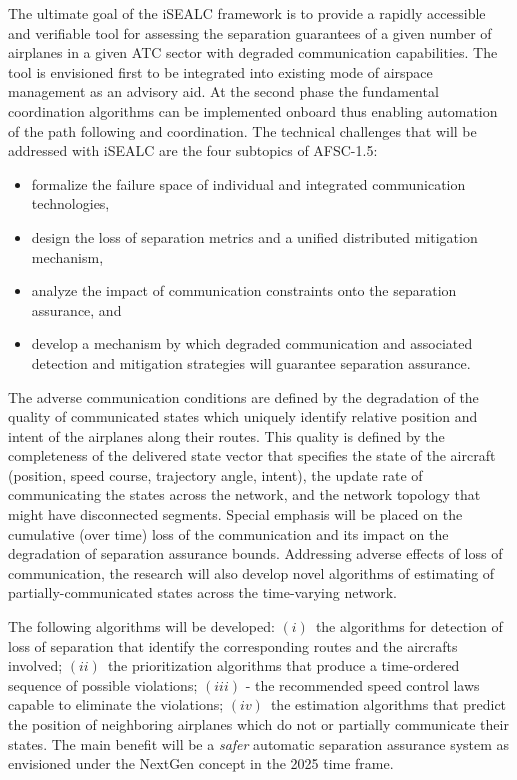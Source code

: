 \documentclass[letter,onecolumn,12pt]{aiaa-tc}
\newcommand{\1}{1_n}
\begin{document}
The ultimate goal of the iSEALC framework is to provide a rapidly accessible and verifiable tool for assessing the separation guarantees of a given number of airplanes in a given ATC sector with degraded communication capabilities.  The tool is  envisioned first to be integrated into existing mode of airspace management as an advisory aid. At the second phase the fundamental coordination algorithms can be implemented onboard thus enabling automation of the path following and coordination. The technical challenges that will be addressed with iSEALC are the four subtopics of AFSC-1.5:
\vspace{-2mm}
\begin{itemize}
\setlength{\itemsep}{-4pt}
    \item formalize the failure space of individual and integrated communication technologies,
    \item design the loss of separation metrics and a unified distributed mitigation mechanism,
    \item analyze the impact of  communication constraints onto the separation assurance, and
    \item develop a mechanism by which degraded communication and associated detection and mitigation strategies will guarantee separation assurance.
\end{itemize}
\vspace{-2mm}

The adverse communication conditions are defined by the degradation of the quality of communicated states which uniquely identify relative position and intent of the airplanes along their routes. This quality is defined by the completeness of the delivered state vector that specifies the state of the aircraft (position, speed course, trajectory angle, intent), the update rate of communicating the states across the network, and the network topology that might have disconnected segments. Special emphasis will be placed on the cumulative (over time) loss of the communication and its impact on the degradation of separation assurance bounds. Addressing adverse effects of loss of communication, the research will also develop novel algorithms of estimating of partially-communicated states across the time-varying network.

The following algorithms will be developed: $(i)$~the algorithms for detection of loss of separation that identify the corresponding routes and the aircrafts involved; $(ii)$~the prioritization algorithms that produce a time-ordered sequence of possible violations; $(iii)$ - the recommended speed control laws capable to eliminate the violations; $(iv)$~the estimation algorithms that predict the position of neighboring airplanes which do not or partially communicate their states. The main benefit will be a \emph{safer} automatic separation assurance system as envisioned under the NextGen concept in the 2025 time frame.
\end{document}
